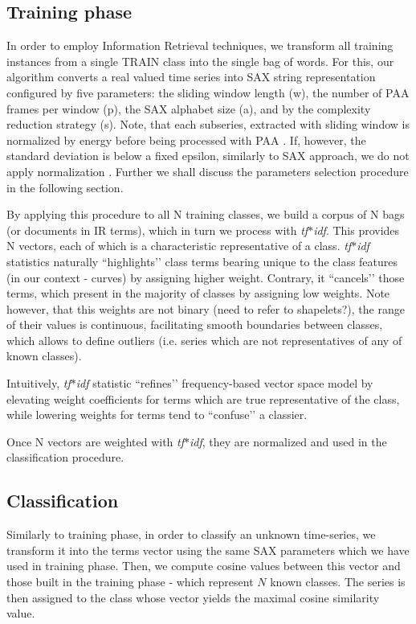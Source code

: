 \documentclass{llncs}
\begin{document}
\subsection{Training phase}
In order to employ Information Retrieval techniques, we transform all training instances from a
single TRAIN class into the single bag of words. For this, our algorithm converts a real valued time
series into SAX string representation configured by five parameters: the sliding window length (w),
the number of PAA frames per window (p), the SAX alphabet size (a), and by the complexity reduction
strategy (s). Note, that each subseries, extracted with sliding window is normalized by energy
before being processed with PAA \cite{goldin_kanellakis}. If, however, the standard deviation is
below a fixed epsilon, similarly to SAX approach, we do not apply normalization
\cite{sax}. Further we shall discuss the parameters selection procedure in the following section.

By applying this procedure to all N training classes, we build a corpus of N bags (or documents in
IR terms), which in turn we process with \textit{tf$\ast$idf}. This provides N vectors, each of
which is a characteristic representative of a class. \textit{tf$\ast$idf} statistics naturally
``highlights’’ class terms bearing unique to the class features (in our context - curves) by
assigning higher weight. Contrary, it ``cancels’’ those terms, which present in the majority of
classes by assigning low weights. Note however, that this weights are not binary (need to refer to
shapelets?), the range of their values is continuous, facilitating smooth boundaries between
classes, which allows to define outliers (i.e. series which are not representatives of any of known
classes).

Intuitively, \textit{tf$\ast$idf} statistic ``refines’’ frequency-based vector space model by
elevating weight coefficients for terms which are true representative of the class, while lowering
weights for terms tend to ``confuse’’ a classier.

Once N vectors are weighted with \textit{tf$\ast$idf}, they are normalized and used in the
classification procedure.

\subsection{Classification}
Similarly to training phase, in order to classify an unknown time-series, we transform it into the
terms vector using the same SAX parameters which we have used in training phase. Then, we compute
cosine values between this vector and those built in the training phase - which represent $N$ known
classes. The series is then assigned to the class whose vector yields the maximal cosine similarity
value.
\end{document}
